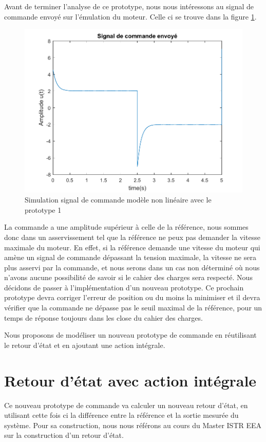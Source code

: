 Avant de terminer l'analyse de ce prototype, nous nous intéressons au signal de commande envoyé sur l'émulation du moteur. Celle ci se trouve dans la figure \ref{fig:comNL_proto1}. 
\begin{figure}[!ht]
\centering
\includegraphics[width = .8\textwidth]{./IV/images/comNLproto1.pdf}
\caption{Simulation signal de commande modèle non linéaire avec le prototype 1\label{fig:comNL_proto1}}
\end{figure}  
La commande a une amplitude supérieur à celle de la référence, nous sommes donc dans un asservissement tel que la référence ne peux pas demander la vitesse maximale du moteur. En effet, si la référence demande une vitesse du moteur qui amène un signal de commande dépassant la tension maximale, la vitesse ne sera plus asservi par la commande, et nous serons dans un cas non déterminé où nous n'avons aucune possibilité de savoir si le cahier des charges sera respecté.
Nous décidons de passer à l'implémentation d'un nouveau prototype. Ce prochain prototype devra corriger l'erreur de position ou du moins la minimiser et il devra vérifier que la commande ne dépasse pas le seuil maximal de la référence, pour un temps de réponse toujours dans les close du cahier des charges.

\begin{center}
Nous proposons de modéliser un nouveau prototype de commande en réutilisant le retour d'état et en ajoutant une action intégrale.
\end{center}
\section{Retour d'état avec action intégrale}
		Ce nouveau prototype de commande va calculer un nouveau retour d'état, en utilisant cette fois ci la différence entre la référence et la sortie mesurée du système. Pour sa construction, nous nous référons au cours du Master ISTR EEA sur la construction d'un retour d'état. 

